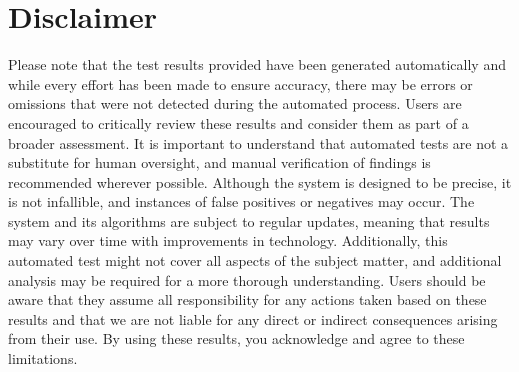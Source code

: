 \section{Disclaimer}

Please note that the test results provided have been generated automatically and while every effort has been made to ensure accuracy, there may be errors or omissions that were not detected during the automated process. Users are encouraged to critically review these results and consider them as part of a broader assessment. It is important to understand that automated tests are not a substitute for human oversight, and manual verification of findings is recommended wherever possible. Although the system is designed to be precise, it is not infallible, and instances of false positives or negatives may occur. The system and its algorithms are subject to regular updates, meaning that results may vary over time with improvements in technology. Additionally, this automated test might not cover all aspects of the subject matter, and additional analysis may be required for a more thorough understanding. Users should be aware that they assume all responsibility for any actions taken based on these results and that we are not liable for any direct or indirect consequences arising from their use. By using these results, you acknowledge and agree to these limitations.